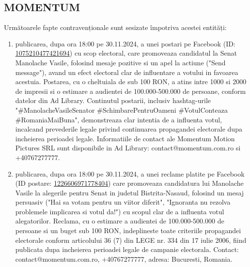 \documentclass[a4paper,12pt]{article}
\begin{document}
\vspace{0.5cm}

\subsection{MOMENTUM}
Următoarele fapte contravenționale sunt sesizate împotriva acestei entități:

\begin{enumerate}[leftmargin=*, label=\arabic*.)]
    \item publicarea, dupa ora 18:00 pe 30.11.2024, a unei postari pe Facebook (ID: \href{https://www.facebook.com/ads/library/?id=1075210477421694}{1075210477421694}) cu scop electoral, care promoveaza candidatul la Senat Manolache Vasile, folosind mesaje pozitive si un apel la actiune ("Send message"), avand un efect electoral clar de influentare a votului in favoarea acestuia. Postarea, cu o cheltuiala de sub 100 RON, a atins intre 1000 si 2000 de impresii si o estimare a audientei de 100.000-500.000 de persoane, conform datelor din Ad Library.  Continutul postarii, inclusiv hashtag-urile "\#ManolacheVasileSenator \#SchimbarePentruOameni \#VotulConteaza \#RomaniaMaiBuna", demonstreaza clar intentia de a influenta votul, incalcand prevederile legale privind continuarea propagandei electorale dupa incheierea perioadei legale.  Informatiile de contact ale Momentum Motion Pictures SRL sunt disponibile in Ad Library: contact@momentum.com.ro si +40767277777.
    \item publicarea, dupa ora 18:00 pe 30.11.2024, a unei reclame platite pe Facebook (ID postare: \href{https://www.facebook.com/ads/library/?id=1226606971778404}{1226606971778404}) care promoveaza candidatura lui Manolache Vasile la alegerile pentru Senat in judetul Bistrita-Nasaud, folosind un mesaj persuasiv ("Hai sa votam pentru un viitor diferit", "Ignoranta nu rezolva problemele  implicarea si votul da!") cu scopul clar de a influenta votul alegatorilor.  Reclama, cu o estimare a audientei de 100.000-500.000 de persoane si un buget sub 100 RON, indeplineste toate criteriile propagandei electorale conform articolului 36 (7) din LEGE nr. 334 din 17 iulie 2006, fiind publicata dupa incheierea perioadei legale de campanie electorala.  Contact: contact@momentum.com.ro, +40767277777, adresa: Bucuresti, Romania.

\end{enumerate}
\end{document}
